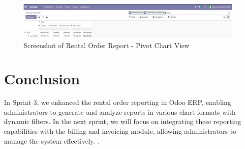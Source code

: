 \begin{figure}[h]
    \centering
    \includegraphics[width=0.\textwidth]{sprint3/reportpivot.png} %
    \caption{Screenshot of Rental Order Report - Pivot Chart View}
    \label{fig:pivot_chart_view}
\end{figure}



\section*{Conclusion}
In Sprint 3, we enhanced the rental order reporting in Odoo ERP, enabling administrators to generate and analyze reports in various chart formats with dynamic filters. In the next sprint, we will focus on integrating these reporting capabilities with the billing and invoicing module, allowing administrators to manage the system effectively.
.
